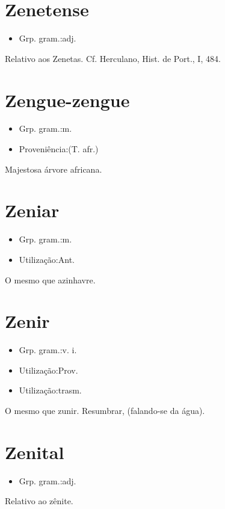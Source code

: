 \section{Zenetense}
\begin{itemize}
\item {Grp. gram.:adj.}
\end{itemize}
Relativo aos Zenetas. Cf. Herculano, \textunderscore Hist. de Port.\textunderscore , I, 484.
\section{Zengue-zengue}
\begin{itemize}
\item {Grp. gram.:m.}
\end{itemize}
\begin{itemize}
\item {Proveniência:(T. afr.)}
\end{itemize}
Majestosa árvore africana.
\section{Zeniar}
\begin{itemize}
\item {Grp. gram.:m.}
\end{itemize}
\begin{itemize}
\item {Utilização:Ant.}
\end{itemize}
O mesmo que \textunderscore azinhavre\textunderscore .
\section{Zenir}
\begin{itemize}
\item {Grp. gram.:v. i.}
\end{itemize}
\begin{itemize}
\item {Utilização:Prov.}
\end{itemize}
\begin{itemize}
\item {Utilização:trasm.}
\end{itemize}
O mesmo que \textunderscore zunir\textunderscore .
Resumbrar, (falando-se da água).
\section{Zenital}
\begin{itemize}
\item {Grp. gram.:adj.}
\end{itemize}
Relativo ao zênite.
